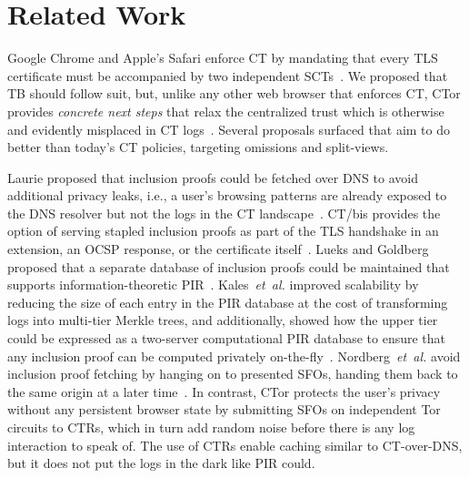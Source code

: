 \section{Related Work} \label{sec:related}
Google Chrome and Apple's Safari enforce CT by mandating that every TLS
certificate must be accompanied by two independent
SCTs~\cite{chrome-policy,safari-policy}.  We proposed that TB should
follow suit, but, unlike any other web browser that enforces CT, CTor provides
\emph{concrete next steps} that relax the centralized trust which is otherwise
and evidently misplaced in CT logs~\cite{%
	izenpe-disqualified,%
	venafi-disqualified,%
	gdca1-omission,%
	digicert-log-compromised%
}.  Several proposals surfaced that aim to do better than today's CT
policies, targeting omissions and split-views.

Laurie proposed that inclusion proofs could be fetched over DNS to avoid
additional privacy leaks, i.e., a user's browsing patterns are already exposed
to the DNS resolver but not the logs in the CT landscape~\cite{ct-over-dns}.
CT/bis provides the option of serving stapled inclusion proofs as part of the
TLS handshake in an extension, an OCSP response, or the certificate
itself~\cite{ct/bis}.
Lueks and Goldberg proposed that a separate database of inclusion proofs could
be maintained that supports information-theoretic PIR~\cite{lueks-and-goldberg}.
Kales~\emph{et~al.} improved scalability by reducing the size of each entry
in the PIR database at the cost of transforming logs into multi-tier Merkle
trees, and additionally, showed how the upper tier could be expressed as
a two-server computational PIR database to ensure that any inclusion proof can
be computed privately on-the-fly~\cite{kales}.
Nordberg~\emph{et~al.} avoid inclusion proof fetching by hanging on to presented
SFOs, handing them back to the same origin at a later time~\cite{nordberg}.
In contrast, CTor protects the user's privacy without any persistent browser state
by submitting SFOs on independent Tor circuits to CTRs, which in turn add random
noise before there is any log interaction to speak of.  The use of CTRs
enable caching similar to CT-over-DNS, but it does not put the logs in the dark
like PIR could.

